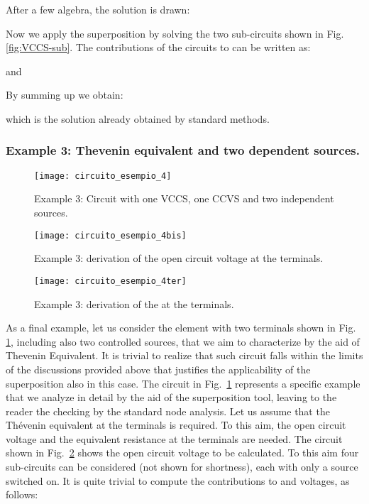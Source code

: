 \documentclass[10pt]{amsart}
\begin{document}
After a few algebra, the solution is drawn:

Now we apply the superposition by solving the two sub-circuits shown in Fig. \ref{fig:VCCS-sub}. The contributions of the circuits to  can be written as:

and

By summing up we obtain:

which is the solution already obtained by standard methods.\\
\subsubsection*{Example 3: Thevenin equivalent and two dependent sources.}
\begin{figure}[h]
\centering
\texttt{[image: circuito\_esempio\_4]}
\caption{Example 3: Circuit with one VCCS, one CCVS and two independent sources.}
\label{fig:VCCS-CCVS}
\end{figure}
\begin{figure}[h]
\centering
\texttt{[image: circuito\_esempio\_4bis]}
\caption{Example 3: derivation of the  open circuit voltage at the terminals.}
\label{fig:VCCS-CCVS-bis}
\end{figure}
\begin{figure}[h]
\centering
\texttt{[image: circuito\_esempio\_4ter]}
\caption{Example 3: derivation of the  at the terminals.}
\label{fig:VCCS-CCVS-ter}
\end{figure}
As a final example, let us consider the element with two terminals shown in Fig. \ref{fig:VCCS-CCVS}, including also two controlled sources, that we aim to characterize by the aid of Thevenin Equivalent. It is trivial to realize that such circuit falls within the limits of the discussions provided above that justifies the applicability of the superposition also in this case. The circuit in Fig.~\ref{fig:VCCS-CCVS} represents a specific example that we analyze in detail by the aid of the superposition tool, leaving to the reader the checking by the standard node analysis. Let us assume that the Th\'evenin equivalent at the terminals  is required. To this aim, the open circuit voltage and the equivalent resistance at the terminals are needed. The circuit shown in Fig.~\ref{fig:VCCS-CCVS-bis} shows the  open circuit voltage to be calculated. To this aim four sub-circuits can be considered (not shown for shortness), each with only a source switched on. It is quite trivial to compute the contributions to  and  voltages, as follows:
\end{document}
